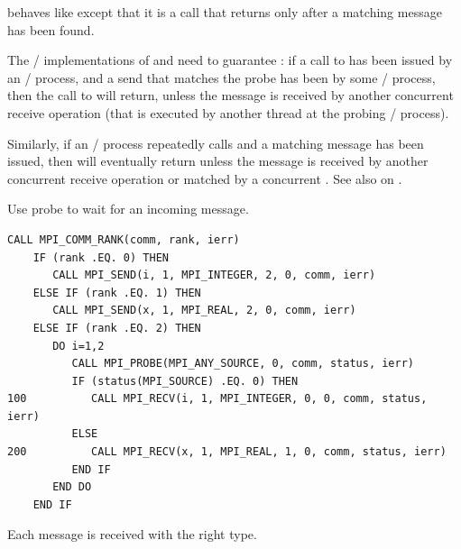  behaves like  except that it is a 
call that returns only after a matching message has been found.

The \MPI/ implementations of  and  need
to guarantee :
if a call to  has been issued by an \MPI/ process, and a send that
matches the probe has been  by some \MPI/ process, then the call to
 will return, unless the message is received by another
concurrent receive operation (that is executed by another thread at the probing
\MPI/ process).

Similarly, if an \MPI/ process repeatedly calls
 and a matching message has been issued,
then
 will eventually return 
unless the message is received by another concurrent receive
operation or matched by a concurrent .
See also  on .

\begin{example}
\label{pt2pt-exP}
%
%
Use probe to wait for an incoming message.

\begin{lstlisting}[language={[MPI]Fortran}]
    CALL MPI_COMM_RANK(comm, rank, ierr)
    IF (rank .EQ. 0) THEN
       CALL MPI_SEND(i, 1, MPI_INTEGER, 2, 0, comm, ierr)
    ELSE IF (rank .EQ. 1) THEN
       CALL MPI_SEND(x, 1, MPI_REAL, 2, 0, comm, ierr)
    ELSE IF (rank .EQ. 2) THEN
       DO i=1,2
          CALL MPI_PROBE(MPI_ANY_SOURCE, 0, comm, status, ierr)
          IF (status(MPI_SOURCE) .EQ. 0) THEN
100          CALL MPI_RECV(i, 1, MPI_INTEGER, 0, 0, comm, status, ierr)
          ELSE
200          CALL MPI_RECV(x, 1, MPI_REAL, 1, 0, comm, status, ierr)
          END IF
       END DO
    END IF
\end{lstlisting}
Each message is received with the right type.
\end{example}


